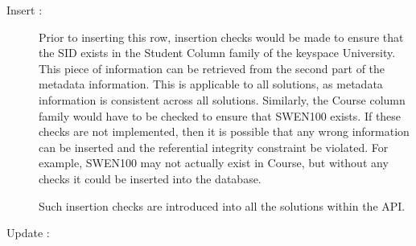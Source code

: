\begin{description}
  \item  [Insert :]%
Prior to inserting this row, insertion checks would be made to ensure
that the SID exists in the Student Column family of the keyspace University. This piece
of information can be retrieved from the second part of the metadata
information. This is applicable to all solutions, as metadata information is
consistent across all solutions. Similarly, the Course column family would have
to be checked to ensure that SWEN100 exists. If these checks are not
implemented, then it is possible that any wrong information can be inserted and
the referential integrity constraint be violated. For example, SWEN100 may not
actually exist in Course, but without any checks it could be inserted into the
database.

Such insertion checks are introduced into all the solutions within the API.

 \item  [Update :]%
% 


\end{description}
